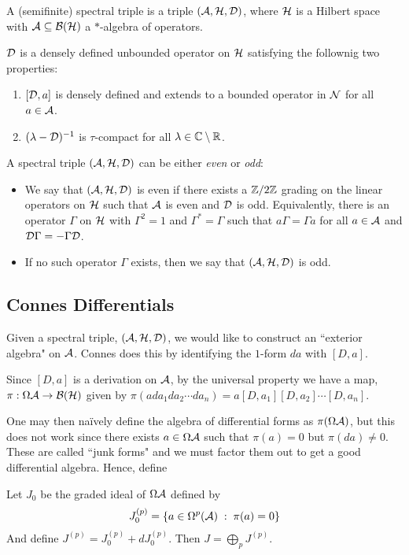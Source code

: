 \begin{definition}
    A (semifinite) spectral triple is a triple $(\mathcal{A},\mathcal{H},\mathcal{D})$, where
    $\mathcal{H}$ is a Hilbert space with $\mathcal{A} \subseteq \mathcal{B}(\mathcal{H})$
    a $*$-algebra of operators.
    
    $\mathcal{D}$ is a densely defined unbounded operator on $\mathcal{H}$ satisfying the follownig
    two properties:
    \begin{enumerate}
        \item{} $[\mathcal{D},a]$ is densely defined and extends to a bounded operator in $\mathcal{N}$
        for all $a \in \mathcal{A}$.
        \item{} $(\lambda -\mathcal{D})^{-1}$ is $\tau$-compact for all $\lambda \in \mathbb{C}\setminus \mathbb{R}$.
    \end{enumerate}
    
    A spectral triple $(\mathcal{A},\mathcal{H},\mathcal{D})$ can be either \emph{even} or \emph{odd}:
    \begin{itemize}
        \item{} We say that $(\mathcal{A},\mathcal{H},\mathcal{D})$ is even if there exists a
        $\mathbb{Z}/2\mathbb{Z}$ grading on the linear operators on $\mathcal{H}$ such that $\mathcal{A}$
        is even and $\mathcal{D}$ is odd. Equivalently, there is an operator $\Gamma$
        on $\mathcal{H}$ with $\Gamma^2 = 1$ and $\Gamma^* = \Gamma$ such that $a\Gamma = \Gamma a$ for all $a \in \mathcal{A}$
        and $\mathcal{D}\Gamma=-\Gamma\mathcal{D}$. 
        \item{} If no such operator $\Gamma$ exists, then we say that $(\mathcal{A},\mathcal{H},\mathcal{D})$
        is odd.
    \end{itemize}
\end{definition}



\subsection{Connes Differentials}
Given a spectral triple, $(\mathcal{A},\mathcal{H},\mathcal{D})$, we would like to construct an ``exterior algebra"
on $\mathcal{A}$. Connes does this by identifying the $1$-form $da$ with $[D,a]$.

Since $[D,a]$ is a derivation on $\mathcal{A}$, by the universal property we have a map, $\pi:\Omega\mathcal{A}\rightarrow \mathcal{B}(\mathcal{H})$
given by $\pi(ada_1da_2\cdots da_n) = a[D,a_1][D,a_2]\cdots[D,a_n]$.

One may then na\"ively define the algebra of differential forms as $\pi(\Omega \mathcal{A})$,
but this does not work since there exists $a \in \Omega \mathcal{A}$ such that $\pi(a) = 0$
but $\pi(da) \neq 0$. These are called ``junk forms" and we must factor them out to get
a good differential algebra. Hence, define
\begin{theorem}
    Let $J_0$ be the graded ideal of $\Omega \mathcal{A}$ defined by 
    \begin{equation*}
        J_0^{(p)} = \{a \in \Omega^p(\mathcal{A}) \;:\; \pi(a) = 0\}
    \end{equation*}
    And define $J^{(p)} = J_0^{(p)} + dJ_0^{(p)}$. Then $J = \bigoplus_p J^{(p)}$.
\end{theorem}

